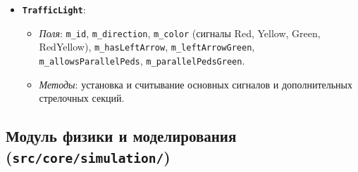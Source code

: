 \documentclass[11pt, a4paper]{article}
\begin{document}
\begin{itemize}
\begin{itemize}
  \end{itemize}
  \item \textbf{\texttt{TrafficLight}}:
  \begin{itemize}
    \item \textit{Поля}: \texttt{m\_id}, \texttt{m\_direction}, \texttt{m\_color} (сигналы Red, Yellow, Green, RedYellow), \texttt{m\_hasLeftArrow}, \texttt{m\_leftArrowGreen}, \texttt{m\_allowsParallelPeds}, \texttt{m\_parallelPedsGreen}.
    \item \textit{Методы}: установка и считывание основных сигналов и дополнительных стрелочных секций.
  \end{itemize}
\end{itemize}

\subsection{Модуль физики и моделирования (\texttt{src/core/simulation/})}
\end{document}
